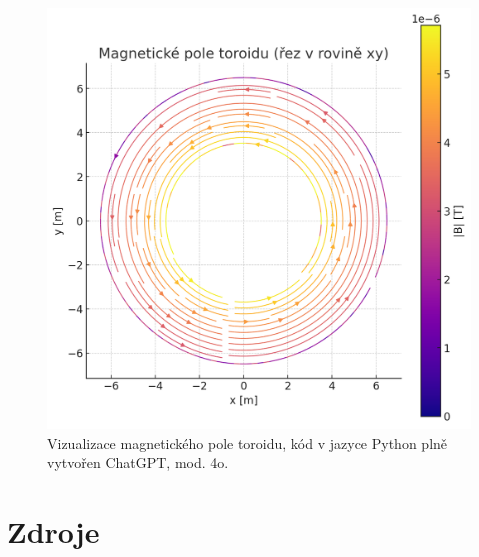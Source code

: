 \documentclass[czech,11pt,a4paper]{article}
\begin{document}
\begin{multicols}{2}
\begin{figure}[H]
			\includegraphics[width=0.8\linewidth]{plot3}
			\caption{Vizualizace magnetického pole toroidu, kód v jazyce Python plně vytvořen ChatGPT, mod. 4o.}
			\label{fig:plot3}
		\end{figure}
		\newpage
		\end{multicols}

	
		
		\section{Zdroje}
		
		
		
		
		
\end{document}

